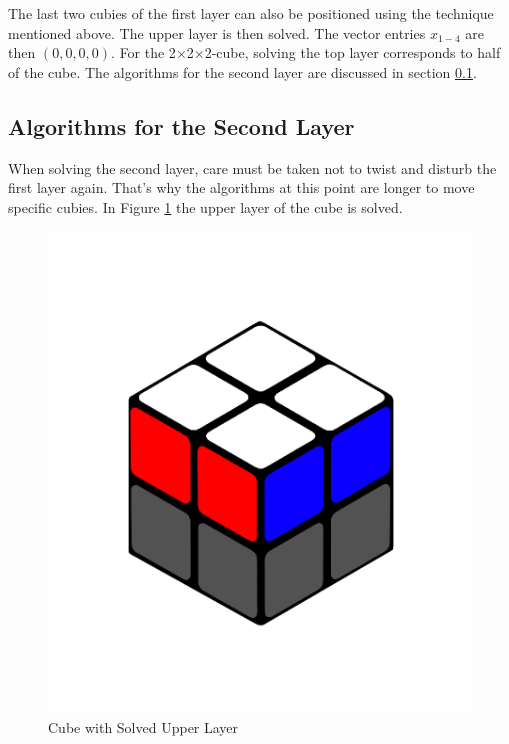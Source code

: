 \documentclass[12pt,a4paper]{article}
\theoremstyle{custom}
\newcommand{\Ttwo}{2$\times$2$\times$2-}
\begin{document}
The last two cubies of the first layer can also be positioned using the technique mentioned above. The upper layer is then solved. The vector entries $x_{1-4}$ are then $(0,0,0,0)$.
For the \Ttwo cube, solving the top layer corresponds to half of the cube. The algorithms for the second layer are discussed in section \ref{Section_AlgorithmsSecondlayer}.

\subsection{Algorithms for the Second Layer}
\label{Section_AlgorithmsSecondlayer}

When solving the second layer, care must be taken not to twist and disturb the first layer again. That's why the algorithms at this point are longer to move specific cubies.
In Figure \ref{Figure_SolvedUpperLayer} the upper layer of the cube is solved.

\begin{figure}[H]
\centering
\includegraphics[scale=0.2]{images/layer.png}
\caption{Cube with Solved Upper Layer}
\label{Figure_SolvedUpperLayer}
\end{figure}
\end{document}
